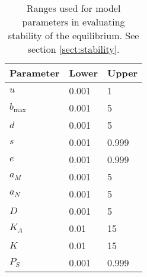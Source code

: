 \documentclass[letterpaper,11pt]{article}
\newcommand{\bmax}{b_{\text{max}}}
\begin{document}
\begin{table}
\begin{center}
\caption{Ranges used for model parameters in evaluating stability of the equilibrium. See section \ref{sect:stability}.}
\label{tab:paramranges}
\begin{tabular}{lll}
\hline
\textbf{Parameter} & \textbf{Lower} & \textbf{Upper} \\
\hline
$u$ & 0.001 & 1 \\
$\bmax$ & 0.001 & 5 \\
$d$ & 0.001 & 5 \\
$s$ & 0.001 & 0.999 \\
$e$ & 0.001 & 0.999 \\
$a_M$ & 0.001 & 5 \\
$a_N$ & 0.001 & 5 \\
$D$ & 0.001 & 5 \\
$K_A$ & 0.01 & 15 \\
$K$ & 0.01 & 15 \\
$P_S$ & 0.001 & 0.999 \\ 
\hline
\end{tabular}
\end{center}
\end{table}
\end{document}
